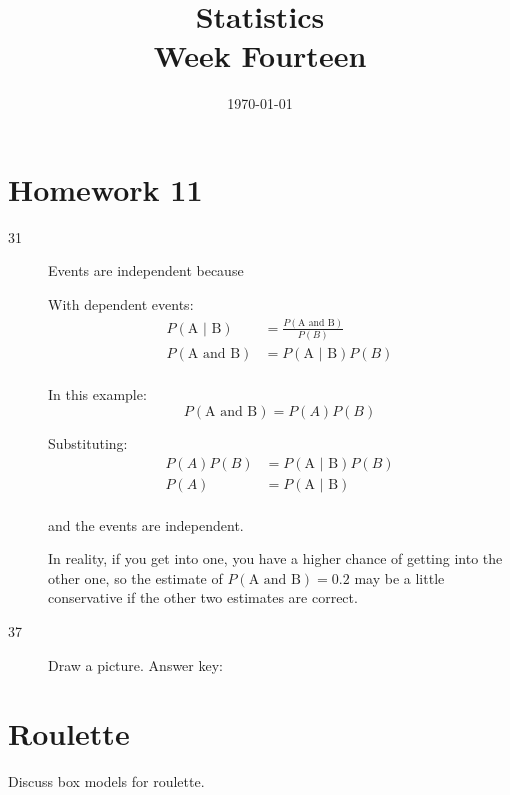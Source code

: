 \documentclass[landscape]{exam}
\title{Statistics \\ Week Fourteen}
\date{\today}
\author{}
\begin{document}
  \maketitle
  \tableofcontents

  \section{Homework 11}
  \begin{description}
    \item[31] Events are independent because

      With dependent events:
      \begin{align*}
        P( \text{A } | \text{ B} ) & = \frac{ P(\text{A and B}) }{ P(B) } \\
        P( \text{A and B} )        & = P( \text{A } | \text{ B} ) P(B) \\
      \end{align*}

      In this example:
      \[
        P(\text{A and B}) = P(A) P(B)
      \]

      Substituting:
      \begin{align*}
        P(A) P(B) & = P( \text{A } | \text{ B} ) P(B) \\
        P(A)      & = P( \text{A } | \text{ B} ) \\
      \end{align*}

      and the events are independent.

      In reality, if you get into one, you have a higher chance of getting into
      the other one, so the estimate of $P(\text{A and B}) = 0.2$ may be a
      little conservative if the other two estimates are correct.


    \item[37] Draw a picture. Answer key:

  \end{description}

  \section{Roulette}
  Discuss box models for roulette.
\end{document}
